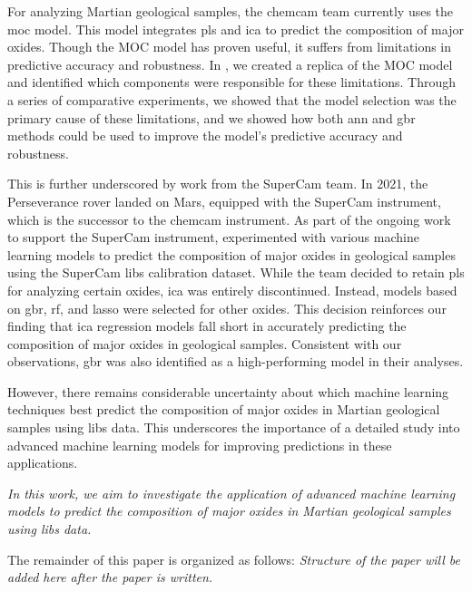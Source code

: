 For analyzing Martian geological samples, the \gls{chemcam} team currently uses the \gls{moc} model\cite{cleggRecalibrationMarsScience2017}.
This model integrates \gls{pls} and \gls{ica} to predict the composition of major oxides.
Though the MOC model has proven useful, it suffers from limitations in predictive accuracy and robustness.
In \citet{p9_paper}, we created a replica of the MOC model and identified which components were responsible for these limitations.
Through a series of comparative experiments, we showed that the model selection was the primary cause of these limitations, and we showed how both \gls{ann} and \gls{gbr} methods could be used to improve the model's predictive accuracy and robustness.

This is further underscored by work from the SuperCam team.
In 2021, the Perseverance rover landed on Mars, equipped with the SuperCam instrument, which is the successor to the \gls{chemcam} instrument.
As part of the ongoing work to support the SuperCam instrument, \citet{andersonPostlandingMajorElement2022} experimented with various machine learning models to predict the composition of major oxides in geological samples using the SuperCam \gls{libs} calibration dataset.
While the team decided to retain \gls{pls} for analyzing certain oxides, \gls{ica} was entirely discontinued.
Instead, models based on \gls{gbr}, \gls{rf}, and \gls{lasso} were selected for other oxides.
This decision reinforces our finding that \gls{ica} regression models fall short in accurately predicting the composition of major oxides in geological samples.
Consistent with our observations, \gls{gbr} was also identified as a high-performing model in their analyses.

However, there remains considerable uncertainty about which machine learning techniques best predict the composition of major oxides in Martian geological samples using \gls{libs} data.
This underscores the importance of a detailed study into advanced machine learning models for improving predictions in these applications.

\textit{In this work, we aim to investigate the application of advanced machine learning models to predict the composition of major oxides in Martian geological samples using \gls{libs} data.}

The remainder of this paper is organized as follows:
\textit{Structure of the paper will be added here after the paper is written.}
